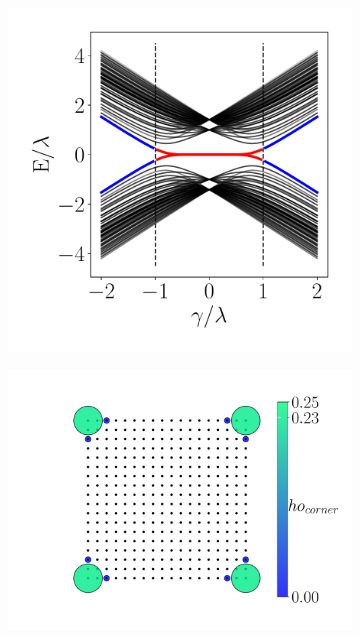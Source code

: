 \begin{figure}[h!]
     \centering
    \captionsetup[sub]{font=small}
     \begin{subfigure}[b!]{0.44 \textwidth}
         \caption{}
         \includegraphics[width=\textwidth]{Imagenes/Resultados_Hoti_Cuadrado/bands_square_shh.pdf}
         \label{}
     \end{subfigure}\hspace*{1em}
     \begin{subfigure}[b!]{0.56 \textwidth}
         \caption{}
         \includegraphics[width=\textwidth]{Imagenes/Resultados_Hoti_Cuadrado/proyection_square.pdf}

\end{subfigure}
\end{figure}
